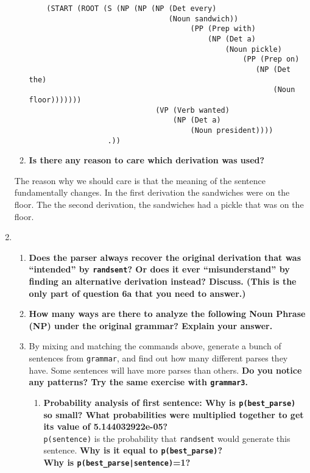 \documentclass[10pt]{article}
\begin{document}
\begin{enumerate}
\begin{enumerate}
\bigskip
\begin{verbatim}
    (START (ROOT (S (NP (NP (NP (Det every)
                                (Noun sandwich))
                                     (PP (Prep with)
                                         (NP (Det a)
                                             (Noun pickle)
                                                 (PP (Prep on)
                                                    (NP (Det the)
                                                        (Noun floor)))))))
                             (VP (Verb wanted)
                                 (NP (Det a)
                                     (Noun president))))
                  .))
\end{verbatim}


\item {\bf Is there any reason to care which derivation was used?}
\end{enumerate}

The reason why we should care is that the meaning of the sentence fundamentally changes. In the first derivation the sandwiches were on the floor. The the second derivation, the sandwiches had a pickle that was on the floor.

\item\begin{enumerate}
 \item {\bf Does the parser
  always recover the original derivation that was ``intended'' by
  \verb|randsent|? Or does it ever ``misunderstand'' by finding an alternative
  derivation instead?  Discuss. (This is the only part of question 6a
  that you need to answer.)}

\item {\bf How many ways are there to analyze the following Noun Phrase (NP)
  under the original grammar?  Explain your answer.}

\item By mixing and matching the commands above, generate a bunch of
  sentences from \verb|grammar|, and find out how many different parses they
  have. Some sentences will have more parses than others. {\bf Do you
  notice any patterns? Try the same exercise with \verb|grammar3|.}

\begin{enumerate} 
\item {\bf Probability analysis of first sentence: Why is \verb|p(best_parse)| so small?  What probabilities were
  multiplied together to get its value of 5.144032922e-05?}\\
\noindent
\verb|p(sentence)| is the probability that \verb|randsent| would
  generate this sentence. {\bf Why is it equal to \verb|p(best_parse)|?}\\
\noindent
{\bf Why is \verb+p(best_parse|sentence)+=1?}


\end{enumerate}
\end{enumerate}
\end{enumerate}
\end{document}
